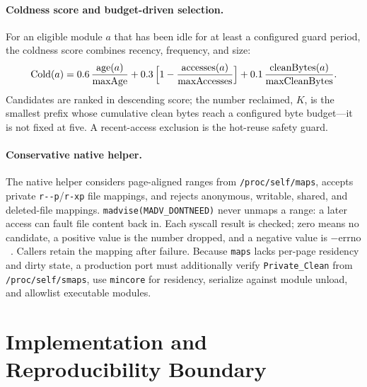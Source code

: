 \documentclass[acmsmall,screen]{acmart}
\begin{document}
\paragraph{Coldness score and budget-driven selection.}
For an eligible module $a$ that has been idle for at least a configured
guard period, the coldness score combines recency, frequency, and size:
\begin{equation}
\mathrm{Cold}(a) = 0.6\,\frac{\mathrm{age}(a)}{\mathrm{maxAge}}
  + 0.3\,\Bigl[1-\frac{\mathrm{accesses}(a)}{\mathrm{maxAccesses}}\Bigr]
  + 0.1\,\frac{\mathrm{cleanBytes}(a)}{\mathrm{maxCleanBytes}}.
\end{equation}
Candidates are ranked in descending score; the number reclaimed, $K$, is
the smallest prefix whose cumulative clean bytes reach a configured byte
budget---it is not fixed at five. A recent-access exclusion is the
hot-reuse safety guard.

\paragraph{Conservative native helper.}
The native helper considers page-aligned ranges from
\texttt{/proc/self/maps}, accepts private \texttt{r-{}-p}/\texttt{r-xp}
file mappings, and rejects anonymous, writable, shared, and deleted-file
mappings. \texttt{madvise(MADV\_DONTNEED)} never unmaps a range: a later
access can fault file content back in. Each syscall result is checked; zero
means no candidate, a positive value is the number dropped, and a negative
value is $-\text{errno}$~\cite{madvise}. Callers retain the mapping after
failure. Because
\texttt{maps} lacks per-page residency and dirty state, a production port
must additionally verify \texttt{Private\_Clean} from
\texttt{/proc/self/smaps}, use \texttt{mincore} for residency, serialize
against module unload, and allowlist executable modules.

\section{Implementation and Reproducibility Boundary}
\label{sec:impl}
\end{document}
